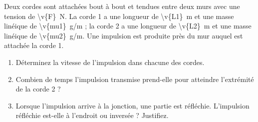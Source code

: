 Deux cordes sont attachées bout à bout et tendues entre deux murs avec une tension de \qty{\v{F}}{N}. La corde 1 a une longueur de \qty{\v{L1}}{m} et une masse linéique de \qty{\v{mu1}}{g/m} ; la corde 2 a une longueur de \qty{\v{L2}}{m} et une masse linéique de \qty{\v{mu2}}{g/m}. Une impulsion est produite près du mur auquel est attachée la corde 1.

\begin{enumerate}[label=\alph*)]
    \item Déterminez la vitesse de l'impulsion dans chacune des cordes.
    \item Combien de temps l'impulsion transmise prend-elle pour atteindre l'extrémité de la corde 2 ?
    \item Lorsque l'impulsion arrive à la jonction, une partie est réfléchie. L'impulsion réfléchie est-elle à l'endroit ou inversée ? Justifiez.
\end{enumerate}
